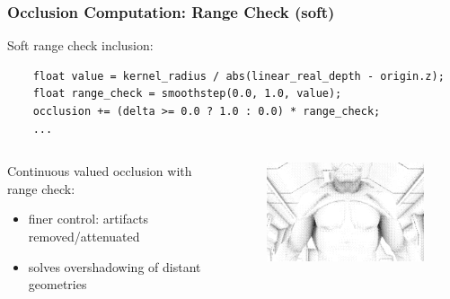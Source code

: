 \documentclass{beamer}
\newcommand{\redtext}[1]{\textcolor{myred}{#1}}
\begin{document}
\begin{frame}[fragile]
\frametitle{Occlusion Computation: Range Check (soft)}
Soft range check inclusion:
\begin{verbatim}
    float value = kernel_radius / abs(linear_real_depth - origin.z);
    float range_check = smoothstep(0.0, 1.0, value);
    occlusion += (delta >= 0.0 ? 1.0 : 0.0) * range_check;
    ...
\end{verbatim}

\begin{columns}
    \begin{column}{0.45\linewidth}
        \redtext{Continuous} valued occlusion with range check:
        \begin{itemize}
            \item \redtext{finer} control: artifacts removed/attenuated
            \item \redtext{solves} overshadowing of distant geometries 
        \end{itemize}
    \end{column}
    \begin{column}{0.45\linewidth}
        \begin{figure}
            \centering
            \includegraphics[width=0.8\linewidth]{images/occlusion_soft_range_check.png}
        \end{figure}
    \end{column}
\end{columns}

\end{frame}
\end{document}
